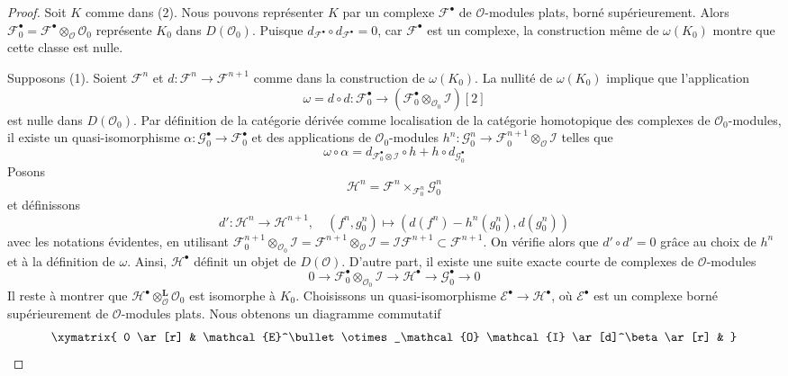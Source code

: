 \begin{proof}
Soit $K$ comme dans (2). Nous pouvons représenter $K$ par un complexe
$\mathcal{F}^\bullet$ de $\mathcal{O}$-modules plats, borné supérieurement.
Alors $\mathcal{F}_0^\bullet =
\mathcal{F}^\bullet \otimes_{\mathcal{O}} \mathcal{O}_0$ représente $K_0$ dans
$D(\mathcal{O}_0)$.
Puisque $d_{\mathcal{F}^\bullet} \circ d_{\mathcal{F}^\bullet} = 0$, car
$\mathcal{F}^\bullet$ est un complexe, la construction même de
$\omega(K_0)$ montre que cette classe est nulle.

\medskip\noindent
Supposons (1). Soient $\mathcal{F}^n$ et
$d : \mathcal{F}^n \to \mathcal{F}^{n + 1}$ comme dans la construction de
$\omega(K_0)$. La nullité de $\omega(K_0)$ implique que l'application
$$
\omega = d \circ d : \mathcal{F}_0^\bullet
\longrightarrow
(\mathcal{F}_0^\bullet \otimes_{\mathcal{O}_0} \mathcal{I})[2]
$$
est nulle dans $D(\mathcal{O}_0)$. Par définition de la catégorie dérivée
comme localisation de la catégorie homotopique des complexes de
$\mathcal{O}_0$-modules, il existe un quasi-isomorphisme
$\alpha : \mathcal{G}_0^\bullet \to \mathcal{F}_0^\bullet$ et des applications
de $\mathcal{O}_0$-modules
$h^n : \mathcal{G}_0^n \to
\mathcal{F}_0^{n + 1} \otimes_\mathcal{O} \mathcal{I}$ telles que
$$
\omega \circ \alpha =
d_{\mathcal{F}_0^\bullet \otimes \mathcal{I}} \circ h +
h \circ d_{\mathcal{G}_0^\bullet}
$$
Posons
$$
\mathcal{H}^n = \mathcal{F}^n \times_{\mathcal{F}^n_0} \mathcal{G}_0^n
$$
et définissons
$$
d' : \mathcal{H}^n \longrightarrow \mathcal{H}^{n + 1},\quad
(f^n, g_0^n) \longmapsto (d(f^n) - h^n(g_0^n), d(g_0^n))
$$
avec les notations évidentes, en utilisant
$\mathcal{F}_0^{n + 1} \otimes_{\mathcal{O}_0} \mathcal{I} =
\mathcal{F}^{n + 1} \otimes_\mathcal{O} \mathcal{I} =
\mathcal{I}\mathcal{F}^{n + 1} \subset \mathcal{F}^{n + 1}$.
On vérifie alors que $d' \circ d' = 0$ grâce au choix de $h^n$
et à la définition de $\omega$.
Ainsi, $\mathcal{H}^\bullet$ définit un objet de $D(\mathcal{O})$.
D'autre part, il existe une suite exacte courte de complexes de
$\mathcal{O}$-modules
$$
0 \to \mathcal{F}_0^\bullet \otimes_{\mathcal{O}_0} \mathcal{I} \to
\mathcal{H}^\bullet \to \mathcal{G}_0^\bullet \to 0
$$
Il reste à montrer que
$\mathcal{H}^\bullet \otimes_\mathcal{O}^\mathbf{L} \mathcal{O}_0$ est
isomorphe à $K_0$.
Choisissons un quasi-isomorphisme
$\mathcal{E}^\bullet \to \mathcal{H}^\bullet$, où
$\mathcal{E}^\bullet$ est un complexe borné supérieurement de
$\mathcal{O}$-modules plats. Nous obtenons un diagramme commutatif
$$
\xymatrix{
0 \ar[r] &
\mathcal{E}^\bullet \otimes_\mathcal{O} \mathcal{I} \ar[d]^\beta \ar[r] &
}$$
\end{proof}
